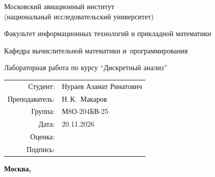 \begin{titlepage}
\begin{center}
\bfseries

{\Large Московский авиационный институт\\ (национальный исследовательский университет)

}

\vspace{48pt}

{\large Факультет информационных технологий и прикладной математики
}

\vspace{36pt}

{\large Кафедра вычислительной математики и~программирования

}


\vspace{48pt}

Лабораторная работа  по курсу \enquote{Дискретный анализ}

\end{center}

\vspace{72pt}

\begin{flushright}
\begin{tabular}{rl}
Студент: & Нураев Азамат Ринатович \\
Преподаватель: & Н.\,К.~Макаров \\
Группа: & М8О-204БВ-25 \\
Дата: & 20.11.2026 \\
Оценка: & \\
Подпись: & \\
\end{tabular}
\end{flushright}

\vfill

\begin{center}
\bfseries
Москва, \the\year
\end{center}
\end{titlepage}

\pagebreak
